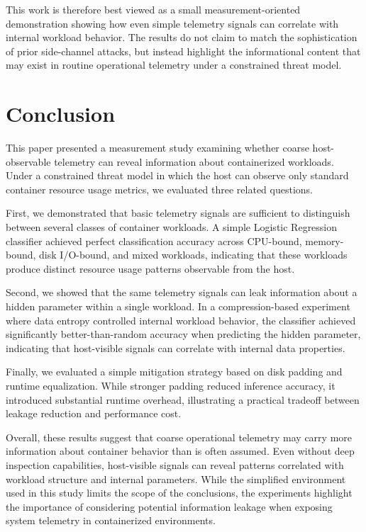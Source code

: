 \documentclass[11pt]{article}
\begin{document}
This work is therefore best viewed as a small measurement-oriented demonstration showing how even simple telemetry signals can correlate with internal workload behavior. The results do not claim to match the sophistication of prior side-channel attacks, but instead highlight the informational content that may exist in routine operational telemetry under a constrained threat model.

\section{Conclusion}

This paper presented a measurement study examining whether coarse host-observable telemetry can reveal information about containerized workloads. Under a constrained threat model in which the host can observe only standard container resource usage metrics, we evaluated three related questions.

First, we demonstrated that basic telemetry signals are sufficient to distinguish between several classes of container workloads. A simple Logistic Regression classifier achieved perfect classification accuracy across CPU-bound, memory-bound, disk I/O-bound, and mixed workloads, indicating that these workloads produce distinct resource usage patterns observable from the host.

Second, we showed that the same telemetry signals can leak information about a hidden parameter within a single workload. In a compression-based experiment where data entropy controlled internal workload behavior, the classifier achieved significantly better-than-random accuracy when predicting the hidden parameter, indicating that host-visible signals can correlate with internal data properties.

Finally, we evaluated a simple mitigation strategy based on disk padding and runtime equalization. While stronger padding reduced inference accuracy, it introduced substantial runtime overhead, illustrating a practical tradeoff between leakage reduction and performance cost.

Overall, these results suggest that coarse operational telemetry may carry more information about container behavior than is often assumed. Even without deep inspection capabilities, host-visible signals can reveal patterns correlated with workload structure and internal parameters. While the simplified environment used in this study limits the scope of the conclusions, the experiments highlight the importance of considering potential information leakage when exposing system telemetry in containerized environments.
\end{document}
